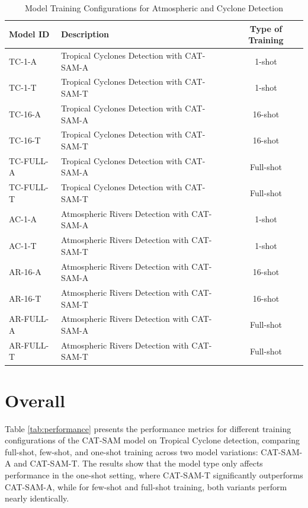 \begin{table}[h]
    \centering
    \caption{Model Training Configurations for Atmospheric and Cyclone Detection}
    \label{tab:climatenet}
    \begin{tabular}{l l c}
        \toprule
        \textbf{Model ID} & \textbf{Description} & \textbf{Type of Training} \\
        \midrule
        TC-1-A & Tropical Cyclones Detection with CAT-SAM-A & 1-shot \\
        TC-1-T & Tropical Cyclones Detection with CAT-SAM-T & 1-shot \\
        TC-16-A & Tropical Cyclones Detection with CAT-SAM-A & 16-shot \\
        TC-16-T & Tropical Cyclones Detection with CAT-SAM-T & 16-shot \\
        TC-FULL-A & Tropical Cyclones Detection with CAT-SAM-A & Full-shot \\
        TC-FULL-T & Tropical Cyclones Detection with CAT-SAM-T & Full-shot \\
        AC-1-A & Atmospheric Rivers Detection with CAT-SAM-A & 1-shot \\
        AC-1-T & Atmospheric Rivers Detection with CAT-SAM-T & 1-shot \\
        AR-16-A & Atmospheric Rivers Detection with CAT-SAM-A & 16-shot \\
        AR-16-T & Atmospheric Rivers Detection with CAT-SAM-T & 16-shot \\
        AR-FULL-A & Atmospheric Rivers Detection with CAT-SAM-A & Full-shot \\
        AR-FULL-T & Atmospheric Rivers Detection with CAT-SAM-T & Full-shot \\
        \bottomrule
    \end{tabular}
\end{table}

\section{Overall}

Table \ref{tab:performance} presents the performance metrics for different training configurations of the CAT-SAM model on Tropical Cyclone detection, comparing full-shot, few-shot, and one-shot training across two model variations: CAT-SAM-A and CAT-SAM-T. The results show that the model type only affects performance in the one-shot setting, where CAT-SAM-T significantly outperforms CAT-SAM-A, while for few-shot and full-shot training, both variants perform nearly identically.

